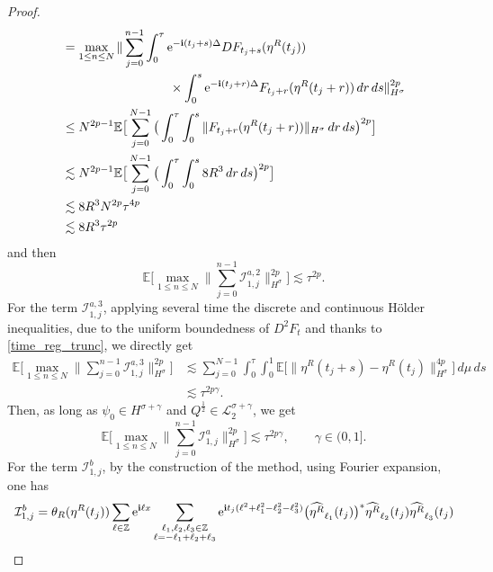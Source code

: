 \documentclass[a4paper]{amsart}
\begin{document}
\begin{proof}
\begin{align*}
        &= \max_{1\le n\le N}\|\sum_{j=0}^{n-1}\int_0^\tau {\rm e}^{-{\bf i}(t_j+s)\Delta} DF_{t_j+s}(\eta^R(t_j))\\
        &\hspace{3cm}\times \int_0^s {\rm e}^{-{\bf i}(t_j+r)\Delta} F_{t_j+r}(\eta^R(t_j+r))\,dr\,ds\|^{2p}_{H^\sigma}\\
        & \le N^{2p-1}\mathbb{E}\big[\sum_{j=0}^{N-1} \big(\int_0^\tau \int_0^s  \|F_{t_j+r}(\eta^R(t_j+r))\|_{H^\sigma}\,dr\,ds\big)^{2p}\big]\\
        & \lesssim N^{2p-1}\mathbb{E}\big[\sum_{j=0}^{N-1} \big(\int_0^\tau \int_0^s 8 R^{3}\,dr\,ds\big)^{2p}\big]\\
        &\lesssim 8 R^3 N^{2p}\tau^{4p}\\
        &\lesssim 8 R^3 \tau^{2p}
    \end{align*}
    and then
    $$
    \mathbb{E}\big[\max_{1\le n\le N}\|\sum_{j=0}^{n-1} \mathcal{I}_{1,j}^{a,2}\|^{2p}_{H^\sigma}\big]\lesssim \tau^{2p}.
    $$
    For the term $\mathcal{I}_{1,j}^{a,3}$, applying several time the discrete and continuous Hölder inequalities, due to the uniform boundedness of $D^2 F_t$ and thanks to \eqref{time_reg_trunc}, we directly get
    \begin{align*}
    \mathbb{E}\big[\max_{1\le n\le N}\|\sum_{j=0}^{n-1} \mathcal{I}_{1,j}^{a,3}\|^{2p}_{H^\sigma}\big]& \lesssim \sum_{j=0}^{N-1} \int_0^\tau \int_0^1 \mathbb{E}\big[\|\eta^R(t_j+s)-\eta^R(t_j)\|^{4p}_{H^\sigma}\big]\,d\mu\,ds\\
    &\lesssim \tau^{2p\gamma}.
    \end{align*}
    Then, as long as $\psi_0\in H^{\sigma+\gamma}$ and $Q^{\frac{1}{2}}\in \mathcal{L}_2^{\sigma+\gamma}$, we get
    $$
    \mathbb{E}\big[\max_{1\le n\le N} \|\sum_{j=0}^{n-1}\mathcal{I}_{1,j}^a\|^{2p}_{H^\sigma}\big]\lesssim \tau^{2p\gamma}, \qquad \gamma\in(0,1].
    $$
    For the term $\mathcal{I}_{1,j}^b$, by the construction of the method, using Fourier expansion, one has
    \begin{align*}
    \mathcal{I}_{1,j}^b&=\theta_R(\eta^R(t_j))\sum_{\ell \in \mathbb{Z}}{\rm e}^{{\bf i}\ell x}\sum_{\substack{\ell_1,\ell_2,\ell_3 \in \mathbb{Z}\\ \ell=-\ell_1+\ell_2+\ell_3\\ }}{\rm e}^{{\bf i}t_j (\ell^2+\ell_1^2-\ell_2^2-\ell_3^2)}\big(\widehat{\eta^R}_{\ell_1}(t_j)\big)^*\widehat{\eta^R}_{{\ell_2}}(t_j)\widehat{\eta^R}_{{\ell_3}}(t_j)\\

\end{align*}
\end{proof}
\end{document}
